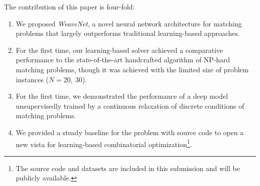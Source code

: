 The contribution of this paper is four-fold:
\begin{enumerate}
   \item We proposed {\it WeaveNet}, a novel neural network architecture for matching problems that largely outperforms traditional learning-based approaches.
   \item For the first time, our learning-based solver achieved a comparative performance to the state-of-the-art handcrafted algorithm of NP-hard matching problems, though it was achieved with the limited size of problem instances ($N=20,~30$).
   \item For the first time, we demonstrated the performance of a deep model unsupervisedly trained by a continuous relaxation of discrete conditions of matching problems.
   \item We provided a steady baseline for the problem with source code to open a new vista for learning-based combinatorial optimization\footnote{The source code and datasets are included in this submission and will be publicly available.}.
\end{enumerate}

